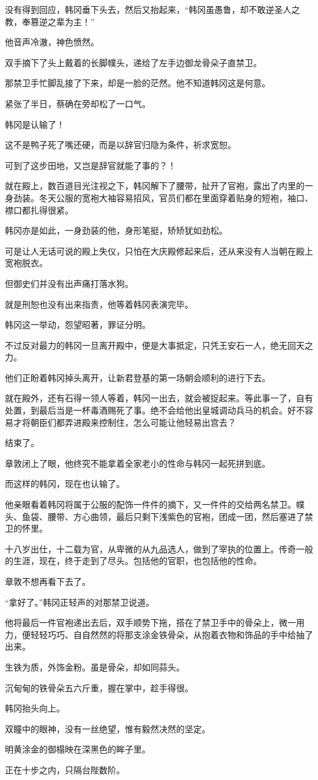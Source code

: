 没有得到回应，韩冈垂下头去，然后又抬起来，“韩冈虽愚鲁，却不敢逆圣人之教，奉篡逆之辈为主！”

他音声冷澈，神色愤然。

双手摘下了头上戴着的长脚幞头，递给了左手边御龙骨朵子直禁卫。

那禁卫手忙脚乱接了下来，却是一脸的茫然。他不知道韩冈这是何意。

紧张了半日，蔡确在旁却松了一口气。

韩冈是认输了！

这不是鸭子死了嘴还硬，而是以辞官归隐为条件，祈求宽恕。

可到了这步田地，又岂是辞官就能了事的？！

就在殿上，数百道目光注视之下，韩冈解下了腰带，扯开了官袍，露出了内里的一身劲装。冬天公服的宽袍大袖容易招风，官员们都在里面穿着贴身的短袍，袖口、襟口都扎得很紧。

韩冈亦是如此，一身劲装的他，身形笔挺，矫矫犹如劲松。

可是让人无话可说的殿上失仪，只怕在大庆殿修起来后，还从来没有人当朝在殿上宽袍脱衣。

但御史们并没有出声痛打落水狗。

就是刑恕也没有出来指责，他等着韩冈表演完毕。

韩冈这一举动，怨望昭著，罪证分明。

不过反对最力的韩冈一旦离开殿中，便是大事抵定，只凭王安石一人，绝无回天之力。

他们正盼着韩冈掉头离开，让新君登基的第一场朝会顺利的进行下去。

就在殿外，还有石得一领人等着，韩冈一出去，就会被捉起来。等此事一了，自有处置，到最后当是一杯毒酒赐死了事。绝不会给他出皇城调动兵马的机会。好不容易才将朝臣们都弄进殿来控制住，怎么可能让他轻易出宫去？

结束了。

章敦闭上了眼，他终究不能拿着全家老小的性命与韩冈一起死拼到底。

而这样的韩冈，现在也认输了。

他亲眼看着韩冈将属于公服的配饰一件件的摘下，又一件件的交给两名禁卫。幞头、鱼袋、腰带、方心曲领，最后只剩下浅紫色的官袍，团成一团，然后塞进了禁卫的怀里。

十八岁出仕，十二载为官，从卑微的从九品选人，做到了宰执的位置上。传奇一般的生涯，现在，终于走到了尽头。包括他的官职，也包括他的性命。

章敦不想再看下去了。

“拿好了。”韩冈正轻声的对那禁卫说道。

他将最后一件官袍递出去后，双手顺势下拖，搭在了禁卫手中的骨朵上，微一用力，便轻轻巧巧、自自然然的将那支涂金铁骨朵，从抱着衣物和饰品的手中给抽了出来。

生铁为质，外饰金粉。虽是骨朵，却如同蒜头。

沉甸甸的铁骨朵五六斤重，握在掌中，趁手得很。

韩冈抬头向上。

双瞳中的眼神，没有一丝绝望，惟有毅然决然的坚定。

明黄涂金的御榻映在深黑色的眸子里。

正在十步之内，只隔台陛数阶。

